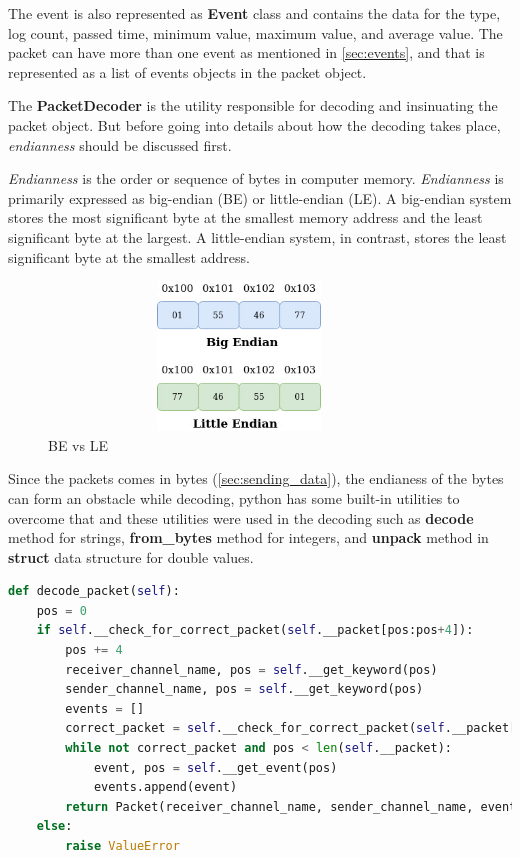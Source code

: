 The event is also represented as \textbf{Event} class and contains the data for the type, log count, 
passed time, minimum value, maximum value, and average value. The packet can have more than one event
as mentioned in \ref{sec:events}, and that is represented as a list of events objects in the packet object.

The \textbf{PacketDecoder} is the utility responsible for decoding and insinuating the packet object. But
before going into details about how the decoding takes place, \textit{endianness} should be discussed first.

\textit{Endianness} is the order or sequence of bytes in computer memory. 
\textit{Endianness} is primarily expressed as big-endian (BE) or little-endian (LE). 
A big-endian system stores the most significant byte at the smallest memory address and 
the least significant byte at the largest. A little-endian system, in contrast, stores 
the least significant byte at the smallest address.
\newline
\begin{figure}[H]
	\centering
	\includegraphics[width=0.9\textwidth,height=150px]{images/endianess.jpg}
	\caption{BE vs LE}
	\label{fig:be_vs_le}
\end{figure}
Since the packets comes in bytes (\ref{sec:sending_data}), the endianess of the bytes can form
an obstacle while decoding, python has some built-in utilities to overcome that and these utilities
were used in the decoding such as \textbf{decode} method for strings, \textbf{from\_bytes} method for integers,
and \textbf{unpack} method in \textbf{struct} data structure for double values.
\newline
\begin{lstlisting}[language=python, label=code:decoding, caption={decoding of a packet},captionpos=b]
def decode_packet(self):
	pos = 0
	if self.__check_for_correct_packet(self.__packet[pos:pos+4]):
		pos += 4
		receiver_channel_name, pos = self.__get_keyword(pos)
		sender_channel_name, pos = self.__get_keyword(pos)
		events = []
		correct_packet = self.__check_for_correct_packet(self.__packet[pos:pos+4])
		while not correct_packet and pos < len(self.__packet):
			event, pos = self.__get_event(pos)
			events.append(event)
		return Packet(receiver_channel_name, sender_channel_name, events)
	else:
		raise ValueError
\end{lstlisting}
